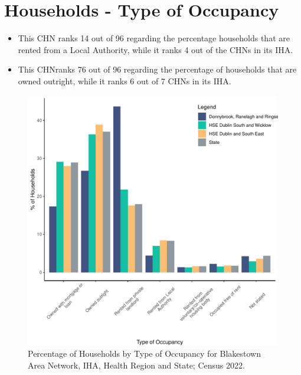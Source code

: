 \documentclass{article}
\begin{document}
\section{Households - Type of Occupancy}\label{sect:Households}
\begin{itemize}
\item This CHN ranks  14 out of 96 regarding the percentage households that are rented from a Local Authority, while it ranks  4 out of the CHNs in its IHA. 
\item This CHNranks  76 out of 96 regarding the percentage of households that are owned outright, while it ranks   6 out of 7 CHNs in its IHA.
\end{itemize}
\begin{figure}[H]
	\centering
	\includegraphics[width = 140mm]{../figures/HouseholdsED.pdf}
	\caption{Percentage of Households by Type of Occupancy for Blakestown Area Network, IHA, Health Region and State; Census 2022.}
	\label{fig:vbnv}
	\end{figure}
\end{document}
